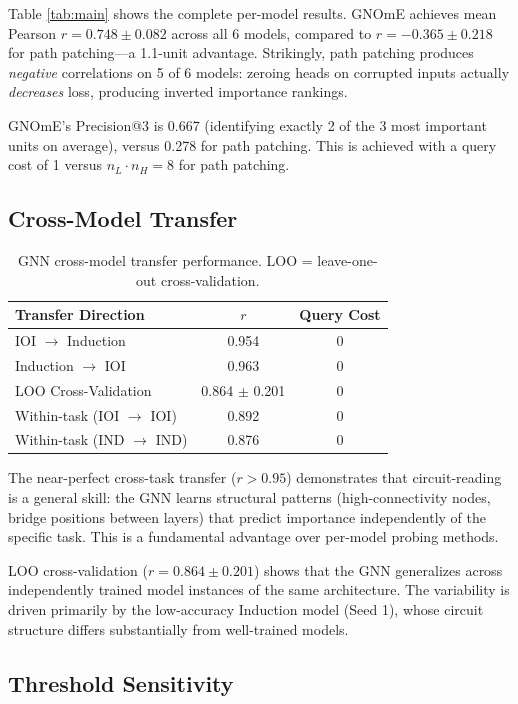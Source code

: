 \documentclass[11pt,a4paper]{article}
\begin{document}
Table \ref{tab:main} shows the complete per-model results. GNOmE achieves mean Pearson $r = 0.748 \pm 0.082$ across all 6 models, compared to $r = -0.365 \pm 0.218$ for path patching---a 1.1-unit advantage. Strikingly, path patching produces \emph{negative} correlations on 5 of 6 models: zeroing heads on corrupted inputs actually \emph{decreases} loss, producing inverted importance rankings.

GNOmE's Precision@3 is 0.667 (identifying exactly 2 of the 3 most important units on average), versus 0.278 for path patching. This is achieved with a query cost of 1 versus $n_L \cdot n_H = 8$ for path patching.

\subsection{Cross-Model Transfer}

\begin{table}[t]
\centering
\caption{GNN cross-model transfer performance. LOO = leave-one-out cross-validation.}
\label{tab:transfer}
\begin{tabular}{lcc}
\toprule
Transfer Direction & $r$ & Query Cost \\
\midrule
IOI $\to$ Induction & 0.954 & 0 \\
Induction $\to$ IOI & 0.963 & 0 \\
LOO Cross-Validation & 0.864 $\pm$ 0.201 & 0 \\
\midrule
Within-task (IOI $\to$ IOI) & 0.892 & 0 \\
Within-task (IND $\to$ IND) & 0.876 & 0 \\
\bottomrule
\end{tabular}
\end{table}

The near-perfect cross-task transfer ($r > 0.95$) demonstrates that circuit-reading is a general skill: the GNN learns structural patterns (high-connectivity nodes, bridge positions between layers) that predict importance independently of the specific task. This is a fundamental advantage over per-model probing methods.

LOO cross-validation ($r = 0.864 \pm 0.201$) shows that the GNN generalizes across independently trained model instances of the same architecture. The variability is driven primarily by the low-accuracy Induction model (Seed 1), whose circuit structure differs substantially from well-trained models.

\subsection{Threshold Sensitivity}
\end{document}
